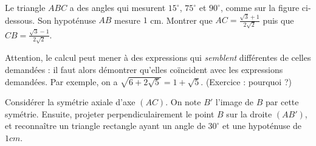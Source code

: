 %
%











\begin{exo}
Le triangle $ABC$ a des angles qui mesurent $15^\circ$, $75^\circ$ et $90^\circ$, comme sur la figure ci-dessous. Son hypoténuse $AB$ mesure $1$ cm. 
Montrer que  $AC=\frac{\sqrt 3 +1}{2\sqrt 2}$ puis que $CB=\frac{\sqrt 3 - 1}{2\sqrt 2}$.


\begin{center}
\end{center}
\begin{hint}
Attention, le calcul peut mener à des expressions qui \emph{semblent} différentes de celles demandées : il faut alors démontrer qu'elles coïncident avec les expressions demandées. Par exemple, on a $\sqrt{6+2\sqrt 5} = 1+\sqrt 5$. (Exercice : pourquoi ?)
\end{hint}
\begin{sol}
Considérer la symétrie axiale d'axe $(AC)$. 
On note $B'$ l'image de $B$ par cette symétrie.
Ensuite, projeter perpendiculairement le point $B$ sur la droite $(AB')$, et reconnaître un triangle rectangle ayant un angle de $30^\circ$ et une hypoténuse de $1cm$.
\end{sol}
\end{exo}



